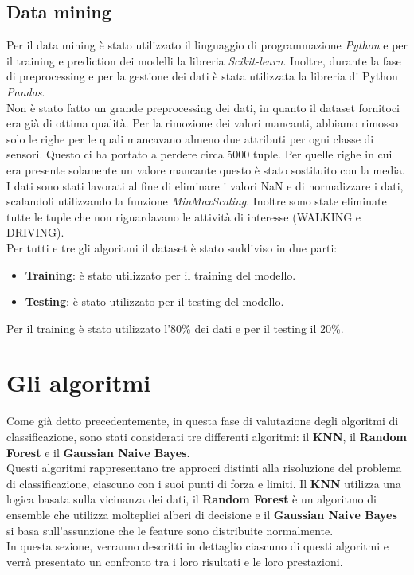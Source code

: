 \documentclass[../../Report.tex]{subfiles}
\begin{document}
\subsection{Data mining}
    Per il data mining è stato utilizzato il linguaggio di programmazione \emph{Python} e per il training e prediction dei modelli la libreria \emph{Scikit-learn}. Inoltre, durante la fase di preprocessing e per la gestione dei dati è stata utilizzata la libreria di Python \emph{Pandas}.\\
    Non è stato fatto un grande preprocessing dei dati, in quanto il dataset fornitoci era già di ottima qualità. Per la rimozione dei valori mancanti, abbiamo rimosso solo le righe per le quali mancavano almeno due attributi per ogni classe di sensori. Questo ci ha portato a perdere circa 5000 tuple. Per quelle righe in cui era presente solamente un valore mancante questo è stato sostituito con la media. I dati sono stati lavorati al fine di eliminare i valori NaN e di normalizzare i dati, scalandoli utilizzando la funzione \emph{MinMaxScaling}. Inoltre sono state eliminate tutte le tuple che non riguardavano le attività di interesse (WALKING e DRIVING).\\
    Per tutti e tre gli algoritmi il dataset è stato suddiviso in due parti:
    \begin{itemize}
        \item \textbf{Training}: è stato utilizzato per il training del modello.
        \item \textbf{Testing}: è stato utilizzato per il testing del modello.
    \end{itemize}
    Per il training è stato utilizzato l'80\% dei dati e per il testing il 20\%.\\

\section{Gli algoritmi}
Come già detto precedentemente, in questa fase di valutazione degli algoritmi di classificazione, sono stati considerati tre differenti algoritmi: il \textbf{KNN}, il \textbf{Random Forest} e il \textbf{Gaussian Naive Bayes}.\\
Questi algoritmi rappresentano tre approcci distinti alla risoluzione del problema di classificazione, ciascuno con i suoi punti di forza e limiti. Il \textbf{KNN} utilizza una logica basata sulla vicinanza dei dati, il \textbf{Random Forest} è un algoritmo di ensemble che utilizza molteplici alberi di decisione e il \textbf{Gaussian Naive Bayes} si basa sull'assunzione che le feature sono distribuite normalmente.\\
In questa sezione, verranno descritti in dettaglio ciascuno di questi algoritmi e verrà presentato un confronto tra i loro risultati e le loro prestazioni.
\end{document}
